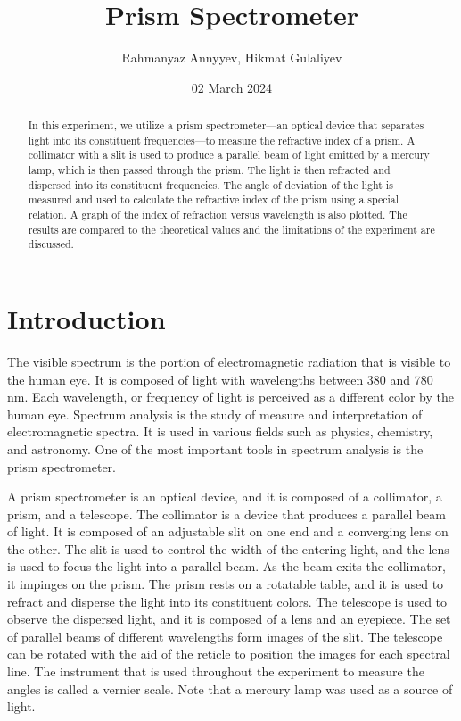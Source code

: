 \documentclass[10pt]{article}
\title{Prism Spectrometer}
\author{Rahmanyaz Annyyev, Hikmat Gulaliyev}
\date{02 March 2024}
\begin{document}
\maketitle

\begin{abstract}
In this experiment, we utilize a prism spectrometer---an optical device that separates light into its constituent frequencies---to measure the refractive index of a prism. A collimator with a slit is used to produce a parallel beam of light emitted by a mercury lamp, which is then passed through the prism. The light is then refracted and dispersed into its constituent frequencies. The angle of deviation of the light is measured and used to calculate the refractive index of the prism using a special relation. A graph of the index of refraction versus wavelength is also plotted. The results are compared to the theoretical values and the limitations of the experiment are discussed.
\end{abstract}

\section{Introduction}

The visible spectrum is the portion of electromagnetic radiation that is visible to the human eye. It is composed of light with wavelengths between 380 and 780 nm. Each wavelength, or frequency of light is perceived as a different color by the human eye\cite{Marcus_1998}. Spectrum analysis is the study of measure and interpretation of electromagnetic spectra. It is used in various fields such as physics, chemistry, and astronomy. One of the most important tools in spectrum analysis is the prism spectrometer. 

A prism spectrometer is an optical device, and it is composed of a collimator, a prism, and a telescope. The collimator is a device that produces a parallel beam of light. It is composed of an adjustable slit on one end and a converging lens on the other. The slit is used to control the width of the entering light, and the lens is used to focus the light into a parallel beam. As the beam exits the collimator, it impinges on the prism. The prism rests on a rotatable table, and it is used to refract and disperse the light into its constituent colors. The telescope is used to observe the dispersed light, and it is composed of a lens and an eyepiece. The set of parallel beams of different wavelengths form images of the slit. The telescope can be rotated with the aid of the reticle to position the images for each spectral line. 
The instrument that is used throughout the experiment to measure the angles is called a vernier scale. Note that a mercury lamp was used as a source of light.
\end{document}
